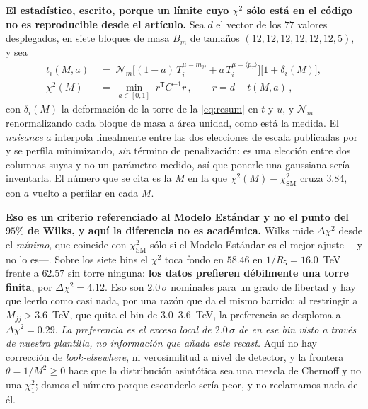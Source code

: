\documentclass[11pt,a4paper]{article}
\begin{document}
\noindent\textbf{El estadístico, escrito, porque un límite cuyo $\chi^2$ sólo está en el código no
es reproducible desde el artículo.} Sea $d$ el vector de los $77$ valores desplegados, en siete
bloques de masa $B_m$ de tamaños $(12,12,12,12,12,12,5)$, y sea
\begin{equation}\label{eq:chisq}
\begin{aligned}
  t_i(M,a)\;&=\;\mathcal N_m\Big[(1-a)\,T_i^{\mu=m_{jj}}
             +a\,T_i^{\mu=\langle p_T\rangle}\Big]\big[1+\delta_i(M)\big],\\[2pt]
  \chi^2(M)\;&=\;\min_{a\in[0,1]}\;r^{\mathsf T}C^{-1}r\,,\qquad r=d-t(M,a)\,,
\end{aligned}
\end{equation}
con $\delta_i(M)$ la deformación de la torre de la \eqref{eq:resum} en $t$ y $u$, y $\mathcal N_m$
renormalizando cada bloque de masa a área unidad, como está la medida. El \emph{nuisance} $a$
interpola linealmente entre las dos elecciones de escala publicadas por \cite{CMSangular} y se
perfila minimizando, \emph{sin} término de penalización: es una elección entre dos columnas suyas y
no un parámetro medido, así que ponerle una gaussiana sería inventarla. El número que se cita es la
$M$ en la que $\chi^2(M)-\chi^2_{\mathrm{SM}}$ cruza $3.84$, con $a$ vuelto a perfilar en cada $M$.

\noindent\textbf{Eso es un criterio referenciado al Modelo Estándar y no el punto del $95\%$ de
Wilks, y aquí la diferencia no es académica.} Wilks mide $\Delta\chi^2$ desde el \emph{mínimo}, que
coincide con $\chi^2_{\mathrm{SM}}$ sólo si el Modelo Estándar es el mejor ajuste ---y no lo es---.
Sobre los siete bins el $\chi^2$ toca fondo en $58.46$ en $1/R_5=16.0$~TeV frente a $62.57$ sin
torre ninguna: \textbf{los datos prefieren débilmente una torre finita}, por $\Delta\chi^2=4.12$.
Eso son $2.0\,\sigma$ nominales para un grado de libertad y hay que leerlo como casi nada, por una
razón que da el mismo barrido: al restringir a $M_{jj}>3.6$~TeV, que quita el bin de
$3.0$--$3.6$~TeV, la preferencia se desploma a $\Delta\chi^2=0.29$. \emph{La preferencia es el
exceso local de $2.0\,\sigma$ de \cite{CMSangular} en ese bin visto a través de nuestra plantilla,
no información que añada este recast.} Aquí no hay corrección de \emph{look-elsewhere}, ni
verosimilitud a nivel de detector, y la frontera $\theta=1/M^2\ge0$ hace que la distribución
asintótica sea una mezcla de Chernoff y no una $\chi^2_1$; damos el número porque esconderlo sería
peor, y no reclamamos nada de él.
\end{document}

